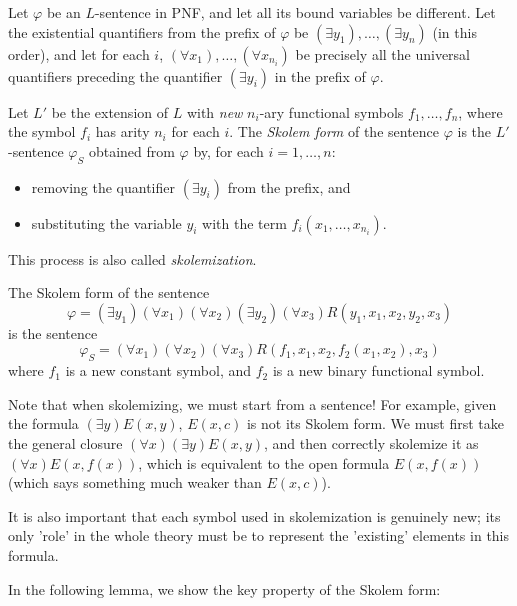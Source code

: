 \begin{definition}
Let $\varphi$ be an $L$-sentence in PNF, and let all its bound variables be different. Let the existential quantifiers from the prefix of $\varphi$ be $(\exists y_1),\dots,(\exists y_n)$ (in this order), and let for each $i$, $(\forall x_1),\dots,(\forall x_{n_i})$ be precisely all the universal quantifiers preceding the quantifier $(\exists y_i)$ in the prefix of $\varphi$. 

Let $L'$ be the extension of $L$ with \emph{new} $n_i$-ary functional symbols $f_1,\dots,f_n$, where the symbol $f_i$ has arity $n_i$ for each $i$. The \emph{Skolem form} of the sentence $\varphi$ is the $L'$-sentence $\varphi_S$ obtained from $\varphi$ by, for each $i=1,\dots,n$:
\begin{itemize}
    \item removing the quantifier $(\exists y_i)$ from the prefix, and
    \item substituting the variable $y_i$ with the term $f_i(x_1,\dots,x_{n_i})$.
\end{itemize}
This process is also called \emph{skolemization}.
\end{definition}

\begin{example}
    The Skolem form of the sentence 
    $$\varphi=(\exists y_1)(\forall x_1)(\forall x_2)(\exists y_2)(\forall x_3)R(y_1,x_1,x_2,y_2,x_3)$$
    is the sentence
    $$
    \varphi_S=(\forall x_1)(\forall x_2)(\forall x_3)R(f_1,x_1,x_2,f_2(x_1,x_2),x_3)
    $$
    where $f_1$ is a new constant symbol, and $f_2$ is a new binary functional symbol.
\end{example}

\begin{remark}
    Note that when skolemizing, we must start from a sentence! For example, given the formula $(\exists y)E(x,y)$, $E(x,c)$ is not its Skolem form. We must first take the general closure $(\forall x)(\exists y)E(x,y)$, and then correctly skolemize it as $(\forall x)E(x,f(x))$, which is equivalent to the open formula $E(x,f(x))$ (which says something much weaker than $E(x,c)$).

    It is also important that each symbol used in skolemization is genuinely new; its only 'role' in the whole theory must be to represent the 'existing' elements in this formula.
\end{remark} 

In the following lemma, we show the key property of the Skolem form:

